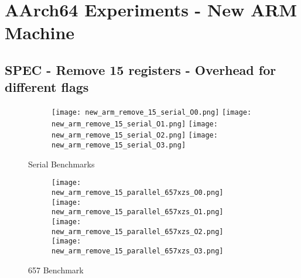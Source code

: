 \documentclass[11pt]{article}
\begin{document}
    \section*{AArch64 Experiments - New ARM Machine}

    \subsection*{SPEC - Remove 15 registers - Overhead for different flags}

    \begin{figure}[ht]
        \begin{subfigure}{\linewidth}
            \texttt{[image: new\_arm\_remove\_15\_serial\_O0.png]}\hfill
            \texttt{[image: new\_arm\_remove\_15\_serial\_O1.png]}\hfill
            \texttt{[image: new\_arm\_remove\_15\_serial\_O2.png]}\hfill
            \texttt{[image: new\_arm\_remove\_15\_serial\_O3.png]}\hfill
        \end{subfigure}\par\medskip
        \caption{Serial Benchmarks}
        \label{fig:new_arm_figs_1}
    \end{figure}

    \begin{figure}[ht]
        \begin{subfigure}{\linewidth}
            \texttt{[image: new\_arm\_remove\_15\_parallel\_657xzs\_O0.png]}\hfill
            \texttt{[image: new\_arm\_remove\_15\_parallel\_657xzs\_O1.png]}\hfill
            \texttt{[image: new\_arm\_remove\_15\_parallel\_657xzs\_O2.png]}\hfill
            \texttt{[image: new\_arm\_remove\_15\_parallel\_657xzs\_O3.png]}\hfill
        \end{subfigure}\par\medskip
        \caption{657 Benchmark}
        \label{fig:new_arm_figs_2}
    \end{figure}
\end{document}
